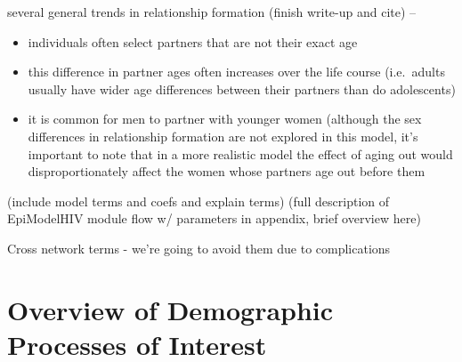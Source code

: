 \documentclass [11pt, proquest] {uwthesis}[2015/03/03]
\providecommand{\tightlist}{%
  \setlength{\itemsep}{0pt}\setlength{\parskip}{0pt}}
\begin{document}
several general trends in relationship formation (finish write-up and
cite) --
\begin{itemize}
\tightlist
\item
  individuals often select partners that are not their exact age
\item
  this difference in partner ages often increases over the life course
  (i.e.~adults usually have wider age differences between their partners
  than do adolescents)
\item
  it is common for men to partner with younger women (although the sex
  differences in relationship formation are not explored in this model,
  it's important to note that in a more realistic model the effect of
  aging out would disproportionately affect the women whose partners age
  out before them
\end{itemize}
(include model terms and coefs and explain terms) (full description of
EpiModelHIV module flow w/ parameters in appendix, brief overview here)

Cross network terms - we're going to avoid them due to complications

\section{Overview of Demographic Processes of
Interest}\label{overview-of-demographic-processes-of-interest}
\end{document}
